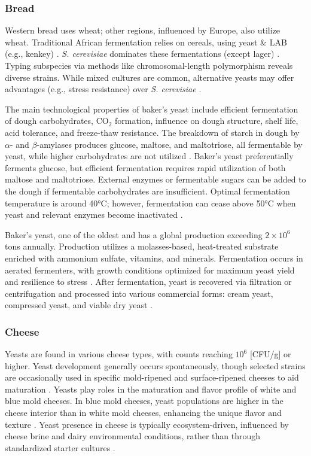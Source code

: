 \subsubsection*{Bread}
Western bread uses wheat; other regions, influenced by Europe, also utilize wheat. Traditional African fermentation relies on cereals, using yeast \& LAB (e.g., kenkey) \cite*{L6-HealthDisease}. \textit{S. cerevisiae} dominates these fermentations (except lager) \cite*{L6-HealthDisease}. Typing subspecies via methods like chromosomal-length polymorphism reveals diverse strains. While mixed cultures are common, alternative yeasts may offer advantages (e.g., stress resistance) over \textit{S. cerevisiae} \cite*{L6-HealthDisease}.

The main technological properties of baker's yeast include efficient fermentation of dough carbohydrates, CO$_2$ formation, influence on dough structure, shelf life, acid tolerance, and freeze-thaw resistance. The breakdown of starch in dough by $\alpha$- and $\beta$-amylases produces glucose, maltose, and maltotriose, all fermentable by yeast, while higher carbohydrates are not utilized \cite{L6-HealthDisease}. Baker's yeast preferentially ferments glucose, but efficient fermentation requires rapid utilization of both maltose and maltotriose. External enzymes or fermentable sugars can be added to the dough if fermentable carbohydrates are insufficient. Optimal fermentation temperature is around 40°C; however, fermentation can cease above 50°C when yeast and relevant enzymes become inactivated \cite{L6-HealthDisease}.

Baker's yeast, one of the oldest and has a global production exceeding \(2 \times 10^6\) tons annually. Production utilizes a molasses-based, heat-treated substrate enriched with ammonium sulfate, vitamins, and minerals. Fermentation occurs in aerated fermenters, with growth conditions optimized for maximum yeast yield and resilience to stress \cite*{L6-HealthDisease}. After fermentation, yeast is recovered via filtration or centrifugation and processed into various commercial forms: cream yeast, compressed yeast, and viable dry yeast \cite*{L6-HealthDisease}.

\subsubsection*{Cheese}
Yeasts are found in various cheese types, with counts reaching \(10^6\) [CFU/g] or higher. Yeast development generally occurs spontaneously, though selected strains are occasionally used in specific mold-ripened and surface-ripened cheeses to aid maturation \cite*{L6-HealthDisease}. Yeasts play roles in the maturation and flavor profile of white and blue mold cheeses. In blue mold cheeses, yeast populations are higher in the cheese interior than in white mold cheeses, enhancing the unique flavor and texture \cite*{L6-HealthDisease}. Yeast presence in cheese is typically ecosystem-driven, influenced by cheese brine and dairy environmental conditions, rather than through standardized starter cultures \cite*{L6-HealthDisease}.

